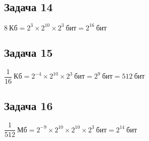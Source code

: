 \subsection{Задача 14}
$ 8\ \text{Кб} = 2^{3} \times 2^{10} \times 2^{3}\ \text{бит} = 2^{16}\ \text{бит} $

\subsection{Задача 15}
$ \dfrac{1}{16}\ \text{Кб} = 2^{-4} \times 2^{10} \times 2^{3}\ \text{бит} = 2^{9}\ \text{бит} = 512\ \text{бит} $

\subsection{Задача 16}
$ \dfrac{1}{512}\ \text{Мб} = 2^{-9} \times 2^{10} \times 2^{10} \times 2^{3}\ \text{бит} 
  = 2^{14}\ \text{бит} $

